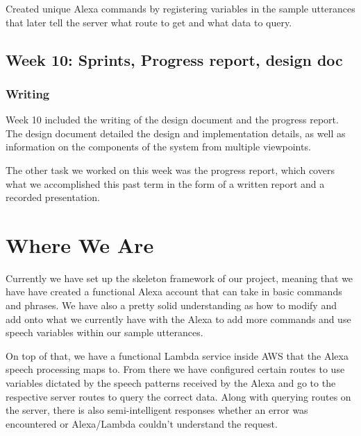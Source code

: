 \documentclass[onecolumn, draftclsnofoot,10pt, compsoc]{IEEEtran}
\begin{document}
            \vspace{10pt}            
            
            Created unique Alexa commands by registering variables in the sample utterances that later tell the server what route to get and what data to query. 
            
            
    
    \subsection{Week 10: Sprints, Progress report, design doc}
        
        \subsubsection{Writing}
            Week 10 included the writing of the design document and the progress report. The design document detailed the design and implementation details, as well as information on the components of the system from multiple viewpoints.
            
            \vspace{10pt}
            
            The other task we worked on this week was the progress report, which covers what we accomplished this past term in the form of a written report and a recorded presentation. 
            
    
    
\section{Where We Are}
	Currently we have set up the skeleton framework of our project, meaning that we have have created a functional Alexa account that can take in basic commands and phrases. We have also a pretty solid understanding as how to modify and add onto what we currently have with the Alexa to add more commands and use speech variables within our sample utterances.
	
	\vspace{10pt}

    On top of that, we have a functional Lambda service inside AWS that the Alexa speech processing maps to. From there we have configured certain routes to use variables dictated by the speech patterns received by the Alexa and go to the respective server routes to query the correct data. Along with querying routes on the server, there is also semi-intelligent responses whether an error was encountered or Alexa/Lambda couldn{'}t understand the request. 
    
\end{document}
